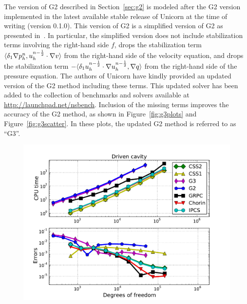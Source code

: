 The version of G2 described in Section~\ref{sec:g2} is modeled after
the G2 version implemented in the latest available stable release of
Unicorn at the time of writing (version 0.1.0). This version of G2 is
a simplified version of G2 as presented in~\citet{HoffmanJohnson2007}.
In particular, the simplified version does not include stabilization
terms involving the right-hand side $f$, drops the stabilization term
$\langle \delta_1 \nabla p_h^n, u_h^{n-\frac{1}{2}} \cdot \nabla v \rangle$
from the right-hand side of the velocity equation, and drops the
stabilization term $- \langle \delta_1 u_h^{n-\frac{1}{2}} \cdot \nabla
  u_h^{n-\frac{1}{2}}, \nabla q \rangle$ from the right-hand side of the
pressure equation. The authors of Unicorn have kindly provided an
updated version of the G2 method including these terms. This updated
solver has been added to the collection of benchmarks and solvers
available at \url{http://launchpad.net/nsbench}. Inclusion of the
missing terms improves the accuracy of the G2 method, as shown in
Figure~\ref{fig:g3plots} and Figure~\ref{fig:g3scatter}. In these
plots, the updated G2 method is referred to as ``G3''.

\begin{figure}
  {\includegraphics[width=\fullfig]{chapters/kvs-1/pdf/drivencavity-plots.pdf}}
\end{figure}

